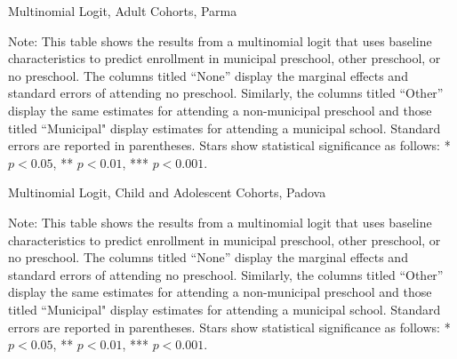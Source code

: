 \begin{table}[H]
\centering
\caption{Multinomial Logit, Adult Cohorts, Parma} \label{mlogit-adult-PR}
\begin{threeparttable}

\begin{tablenotes}
\footnotesize\raggedright{Note: This table shows the results from a multinomial logit that uses baseline characteristics to predict enrollment in municipal preschool, other preschool, or no preschool. The columns titled ``None'' display the marginal effects and standard errors of attending no preschool. Similarly, the columns titled ``Other'' display the same estimates for attending a non-municipal preschool and those titled ``Municipal" display estimates for attending a municipal school. Standard errors are reported in parentheses. Stars show statistical significance as follows: * $p < 0.05$, ** $p < 0.01$, *** $p < 0.001$.}
\end{tablenotes}
\end{threeparttable}
\end{table}

\begin{table}[H]
\centering
\caption{Multinomial Logit, Child and Adolescent Cohorts, Padova} \label{mlogit-chi-ado-PD}
\begin{adjustbox}{width=\textwidth}
\begin{threeparttable}

\begin{tablenotes}
\footnotesize\raggedright{Note: This table shows the results from a multinomial logit that uses baseline characteristics to predict enrollment in municipal preschool, other preschool, or no preschool. The columns titled ``None'' display the marginal effects and standard errors of attending no preschool. Similarly, the columns titled ``Other'' display the same estimates for attending a non-municipal preschool and those titled ``Municipal" display estimates for attending a municipal school. Standard errors are reported in parentheses. Stars show statistical significance as follows: * $p < 0.05$, ** $p < 0.01$, *** $p < 0.001$.}
\end{tablenotes}
\end{threeparttable}
\end{adjustbox}
\end{table}


